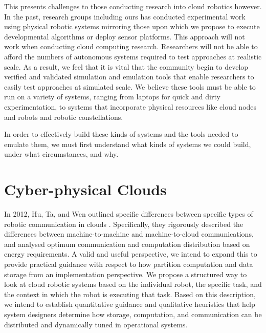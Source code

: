 \documentclass{sig-alternate}
\begin{document}
This presents challenges to those conducting research into cloud robotics however.  In the past, research groups including ours has conducted experimental work using physical robotic systems mirroring those upon which we propose to execute developmental algorithms or deploy sensor platforms.  This approach will not work when conducting cloud computing research.  Researchers will not be able to afford the numbers of autonomous systems required to test approaches at realistic scale.  As a result, we feel that it is vital that the community begin to develop verified and validated simulation and emulation tools that enable researchers to easily test approaches at simulated scale.  We believe these tools must be able to run on a variety of systems, ranging from laptops for quick and dirty experimentation, to systems that incorporate physical resources like cloud nodes and robots and robotic constellations.

In order to effectively build these kinds of systems and the tools needed to emulate them, we must first understand what kinds of systems we could build, under what circumstances, and why.  

\section{Cyber-physical Clouds}
In 2012, Hu, Ta, and Wen outlined specific differences between specific types of robotic communication in clouds \cite{HuTaWe:12}.  Specifically, they rigorously described the differences between machine-to-machine and machine-to-cloud communications, and analysed optimum communication and computation distribution based on energy requirements.  A valid and useful perspective, we intend to expand this to provide practical guidance with respect to how partition computation and data storage from an implementation perspective.  We propose a structured way to look at cloud robotic systems based on the individual robot, the specific task, and the context in which the robot is executing that task.  Based on this description, we intend to establish quantitative guidance and qualitative heuristics that help system designers determine how storage, computation, and communication can be distributed and dynamically tuned in operational systems.
\end{document}
